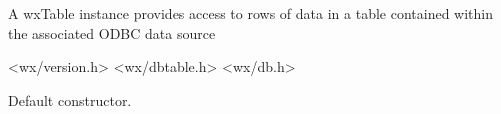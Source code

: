 \section{}\label{wxtable}

A wxTable instance provides access to rows of data in
a table contained within the associated ODBC data source


<wx/version.h>
<wx/dbtable.h>
<wx/db.h>






\label{wxtableconstr}


Default constructor.
